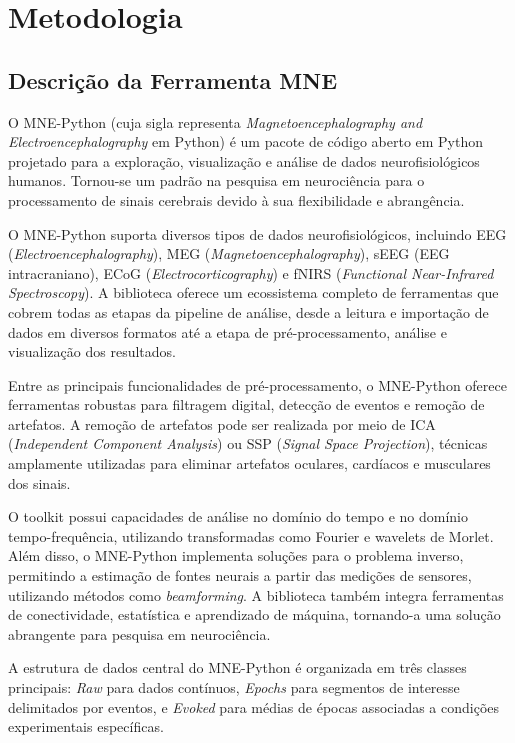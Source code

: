 \chapter{Metodologia}
\label{chap:metodologia}

\section{Descrição da Ferramenta MNE}\label{sec:exemplo-de-algoritmos-e-figuras}

    O MNE-Python (cuja sigla representa \textit{Magnetoencephalography and
    Electroencephalography} em Python) é um pacote de código aberto em Python
    projetado para a exploração, visualização e análise de dados
    neurofisiológicos humanos. Tornou-se um padrão na pesquisa em neurociência
    para o processamento de sinais cerebrais devido à sua flexibilidade e
    abrangência.

    O MNE-Python suporta diversos tipos de dados neurofisiológicos, incluindo
    EEG (\textit{Electroencephalography}), MEG
    (\textit{Magnetoencephalography}), sEEG (EEG intracraniano), ECoG
    (\textit{Electrocorticography}) e fNIRS (\textit{Functional Near-Infrared
    Spectroscopy}). A biblioteca oferece um ecossistema completo de ferramentas
    que cobrem todas as etapas da pipeline de análise, desde a leitura e
    importação de dados em diversos formatos até a etapa de pré-processamento,
    análise e visualização dos resultados.

    Entre as principais funcionalidades de pré-processamento, o MNE-Python
    oferece ferramentas robustas para filtragem digital, detecção de eventos e
    remoção de artefatos. A remoção de artefatos pode ser realizada por meio de
    ICA (\textit{Independent Component Analysis}) ou SSP (\textit{Signal Space
    Projection}), técnicas amplamente utilizadas para eliminar artefatos
    oculares, cardíacos e musculares dos sinais.

    O toolkit possui capacidades de análise no domínio do tempo e no domínio
    tempo-frequência, utilizando transformadas como Fourier e wavelets de
    Morlet. Além disso, o MNE-Python implementa soluções para o problema
    inverso, permitindo a estimação de fontes neurais a partir das medições de
    sensores, utilizando métodos como \textit{beamforming}. A biblioteca também
    integra ferramentas de conectividade, estatística e aprendizado de máquina,
    tornando-a uma solução abrangente para pesquisa em neurociência.

    A estrutura de dados central do MNE-Python é organizada em três classes
    principais: \textit{Raw} para dados contínuos, \textit{Epochs} para
    segmentos de interesse delimitados por eventos, e \textit{Evoked} para
    médias de épocas associadas a condições experimentais específicas.

